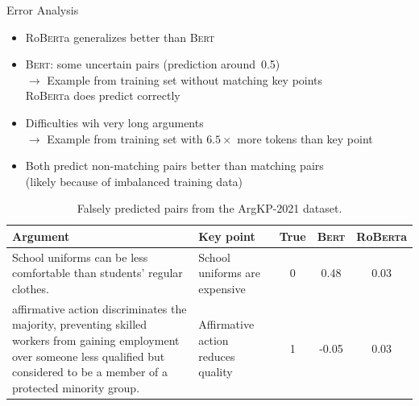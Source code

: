 \documentclass[english,handout]{mlutalk}
\newcommand{\ArgKP}{\mbox{ArgKP-2021}\xspace}
\newcommand{\Bert}{\textsc{Bert}\xspace}
\newcommand{\Roberta}{\mbox{Ro\textsc{Bert}a}\xspace}
\begin{document}
\begin{frame}{Error Analysis}
  \begin{itemize}
    \item \Roberta generalizes better than \Bert
    \item \Bert: some uncertain pairs (prediction around~0.5) \\ \(\to\) Example from training set without matching key points \\ \Roberta does predict correctly
    \item Difficulties wih very long arguments \\ \(\to\) Example from training set with \(6.5\times\) more tokens than key point
    \item Both predict non-matching pairs better than matching pairs \\ (likely because of imbalanced training data)
  \end{itemize}
  \begin{table}
    \smaller\smaller\renewcommand{\arraystretch}{1.35}
    \caption{Falsely predicted pairs from the \ArgKP dataset.}
    \begin{tabularx}{\linewidth}{Xp{2.15cm}ccc}
      \toprule
      \textbf{Argument} & \textbf{Key point} & \textbf{True} & \textbf{\Bert} & \textbf{\Roberta} \\
      \midrule
      School uniforms can be less comfortable than students' regular clothes. & %
      School uniforms are expensive & %
      0 & \phantom{-}0.48 & 0.03 \\
      affirmative action discriminates the majority, preventing skilled workers from gaining employment over someone less qualified but considered to be a member of a protected minority group. & %
      Affirmative action reduces quality & %
      1 & -0.05 & 0.03 \\
      \bottomrule
    \end{tabularx}
  \end{table}
  

\end{frame}
\end{document}
